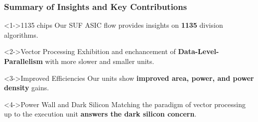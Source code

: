 \begin{frame}
    \frametitle{Summary of Insights and Key Contributions}

    	\begin{alertblock}<1->{1135 chips}
    	        Our SUF ASIC flow provides insights on \textbf{1135} division algorithms.
    	\end{alertblock}

        \begin{block}<2->{Vector Processing}
		Exhibition and enchancement of \textbf{Data-Level-Parallelism} with more slower and smaller units.
        \end{block}

        \begin{block}<3->{Improved Efficiencies}
		Our units show \textbf{improved area, power, and power density} gains.
        \end{block}

        \begin{exampleblock}<4->{Power Wall and Dark Silicon}
		Matching the paradigm of vector processing up to the execution unit \textbf{answers the dark silicon concern}.
        \end{exampleblock}


\end{frame}

%
%
%
%
